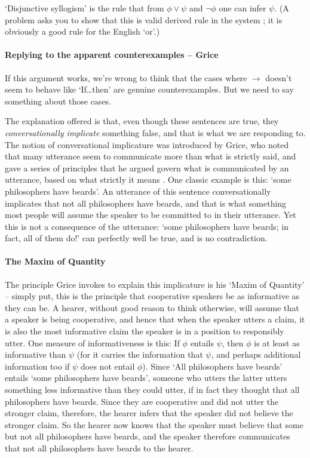 `Disjunctive syllogism' is the rule that from $\phi \vee \psi$ and $\neg \phi$ one can infer $\psi$. (A problem asks you to show that this is valid derived rule in the system \lone; it is obviously a good rule for the English `or'.) 

\paragraph{Replying to the apparent counterexamples – Grice}
If this argument works, we're wrong to think that the cases where $\to$ doesn't seem to behave like `If\ldots then' are genuine counterexamples. But we need to say something about those cases.

The explanation offered is that, even though these sentences are true, they \emph{conversationally implicate} something false, and that is what we are responding to. The notion of conversational implicature was introduced by Grice, who noted that many utterance seem to communicate more than what is strictly said, and gave a series of principles that he argued govern what is communicated by an utterance, based on what strictly it means \citep{grilogco}. One classic example is this: `some philosophers have beards'. An utterance of this sentence conversationally implicates that not all philosophers have beards, and that is what something most people will assume the speaker to be committed to in their utterance. Yet this is not a consequence of the utterance: `some philosophers have beards; in fact, all of them do!' can perfectly well be true, and is no contradiction. 

\paragraph{The Maxim of Quantity}
The principle Grice invokes to explain this implicature is his `Maxim of Quantity' – simply put, this is the principle that cooperative speakers be as informative as they can be. A hearer, without good reason to think otherwise, will assume that a speaker is being cooperative, and hence that when the speaker utters a claim, it is also the most informative claim the speaker is in a position to responsibly utter. One measure of informativeness is this: If $\phi$ entails $\psi$, then $\phi$ is at least as informative than $\psi$ (for it carries the information that $\psi$, and perhaps additional information too if $\psi$ does not entail $\phi$). Since `All philosophers have beards' entails `some philosophers have beards', someone who utters the latter utters something less informative than they could utter, if in fact they thought that all philosophers have beards. Since they are cooperative and did not utter the stronger claim, therefore, the hearer infers that the speaker did not believe the stronger claim. So the hearer now knows that the speaker must believe that some but not all philosophers have beards, and the speaker therefore communicates that not all philosophers have beards to the hearer.

